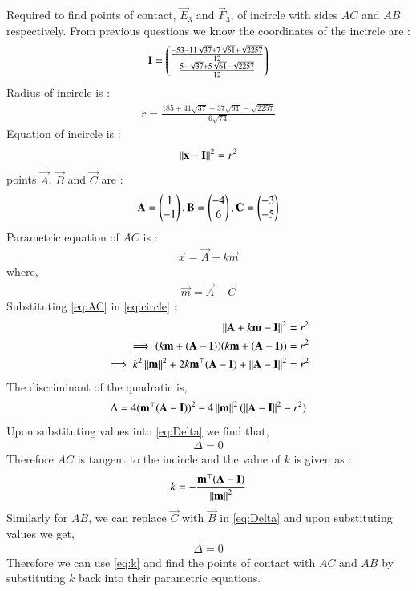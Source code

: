 \documentclass[journal,12pt,twocolumn]{IEEEtran}
\theoremstyle{remark}
\begin{document}
Required to find points of contact, $\vec{E}_3$ and $\vec{F}_3$, of incircle with sides $AC$ and $AB$ respectively.
From previous questions we know the coordinates of the incircle are : 
\begin{align}
	\mathbf{I} = 
	\begin{pmatrix}
		\frac{-53-11\sqrt{37}+7\sqrt{61}+\sqrt{2257}}{12} \\ 
		\frac{5-\sqrt{37}+5\sqrt{61}-\sqrt{2257}}{12}
	\end{pmatrix}
\end{align}
Radius of incircle is :
    \begin{align}
		r = \frac{185+41\sqrt{37}-37\sqrt{61}-\sqrt{2257}}{6\sqrt{74}}
	\end{align}
Equation of incircle is : 
\begin{align}
	{\left\lVert \mathbf{x}-\mathbf{I} \right\rVert}^2 = {r}^2 \label{eq:circle}
\end{align}
points $\vec{A}$, $\vec{B}$ and $\vec{C}$ are : 
\begin{align}
	\mathbf{A} = \begin{pmatrix}
		1\\
		-1
	\end{pmatrix}, 
	\mathbf{B} = \begin{pmatrix}
		-4\\
		6
	\end{pmatrix}, 
	\mathbf{C} = \begin{pmatrix}
		-3\\
		-5
	\end{pmatrix}
\end{align}
Parametric equation of $AC$ is :
\begin{align}
	\vec{x} = \vec{A} + k\vec{m} \label{eq:AC}
\end{align}
where,
\begin{align}
	\vec{m} = \vec{A} - \vec{C}
\end{align}
Substituting \eqref{eq:AC} in \eqref{eq:circle} : 
\begin{align}
	{\left\lVert \mathbf{A}+k\mathbf{m}-\mathbf{I} \right\rVert}^2 &= {r}^2 \\
	\implies (k\mathbf{m} + (\mathbf{A} - \mathbf{I}))(k\mathbf{m} + (\mathbf{A} - \mathbf{I})) &= {r}^2 \\
	\implies k^2 \left\lVert\mathbf{m}\right\rVert^2 + 2k\mathbf{m}^{\top} (\mathbf{A}-\mathbf{I}) + \left\lVert\mathbf{A}-\mathbf{I}\right\rVert^2 &= {r}^2
\end{align}
The discriminant of the quadratic is,
\begin{align}
	\Delta = 4(\mathbf{m}^{\top}(\mathbf{A}-\mathbf{I}))^2 - 4\left\lVert\mathbf{m}\right\rVert^2(\left\lVert\mathbf{A}-\mathbf{I}\right\rVert^2 - r^2) \label{eq:Delta}
\end{align} 
Upon substituting values into \eqref{eq:Delta} we find that,
\begin{align}
	\Delta = 0
\end{align}
Therefore $AC$ is tangent to the incircle and the value of $k$ is given as :
\begin{align}
	k = -\frac{\mathbf{m}^{\top}(\mathbf{A} - \mathbf{I})}{\left\lVert\mathbf{m}\right\rVert^2} \label{eq:k}
\end{align}
Similarly for $AB$, we can replace $\vec{C}$ with $\vec{B}$ in \eqref{eq:Delta} and upon substituting values we get,
\begin{align}
	\Delta = 0
\end{align}
Therefore we can use \eqref{eq:k} and find the points of contact with $AC$ and $AB$ by substituting $k$ back into their parametric equations.
\end{document}
